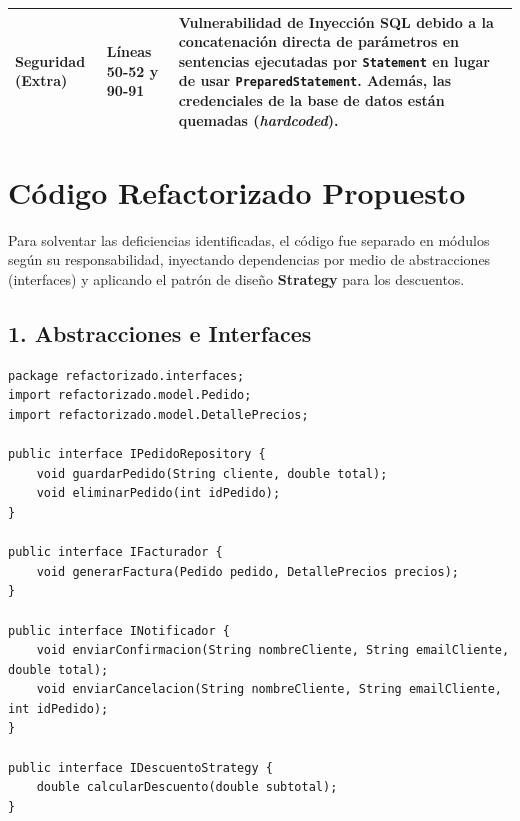 \documentclass[12pt, a4paper]{article}
\begin{document}
\begin{longtable}{p{3.5cm} p{2.2cm} p{9.3cm}}
\textbf{Seguridad (Extra)} & Líneas 50-52 y 90-91 & Vulnerabilidad de \textbf{Inyección SQL} debido a la concatenación directa de parámetros en sentencias ejecutadas por \texttt{Statement} en lugar de usar \texttt{PreparedStatement}. Además, las credenciales de la base de datos están quemadas (\textit{hardcoded}). \\
\bottomrule
\end{longtable}

\newpage
\section{Código Refactorizado Propuesto}
Para solventar las deficiencias identificadas, el código fue separado en módulos según su responsabilidad, inyectando dependencias por medio de abstracciones (interfaces) y aplicando el patrón de diseño \textbf{Strategy} para los descuentos.

\subsection{1. Abstracciones e Interfaces}
\begin{lstlisting}[caption={Abstracciones del Sistema}, label={lst:interfaces}]
package refactorizado.interfaces;
import refactorizado.model.Pedido;
import refactorizado.model.DetallePrecios;

public interface IPedidoRepository {
    void guardarPedido(String cliente, double total);
    void eliminarPedido(int idPedido);
}

public interface IFacturador {
    void generarFactura(Pedido pedido, DetallePrecios precios);
}

public interface INotificador {
    void enviarConfirmacion(String nombreCliente, String emailCliente, double total);
    void enviarCancelacion(String nombreCliente, String emailCliente, int idPedido);
}

public interface IDescuentoStrategy {
    double calcularDescuento(double subtotal);
}
\end{lstlisting}
\end{document}

